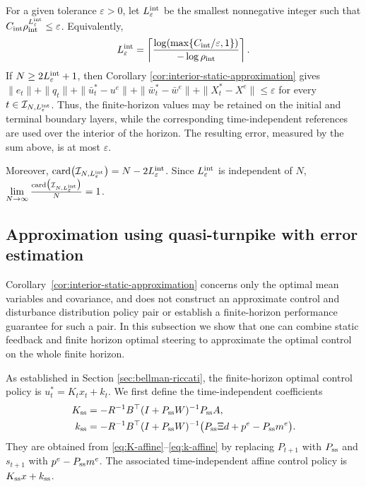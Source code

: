 \documentclass[10pt,journal,twoside]{IEEEtran}
\theoremstyle{definition}
\theoremstyle{remark}
\begin{document}
For a given tolerance \(\varepsilon>0\), let
\(L_{\varepsilon}^{\rm int}\) be the smallest nonnegative integer such that
$C_{\rm int}\rho_{\rm int}^{L_{\varepsilon}^{\rm int}}
\leq \varepsilon$.
Equivalently,
\begin{equation*}
	L_{\varepsilon}^{\rm int}
	=
	\left\lceil
	\frac{
		\log\!\left(
		\max\{C_{\rm int}/\varepsilon,1\}
		\right)
	}{
		-\log\rho_{\rm int}
	}
	\right\rceil .
\end{equation*}
If \(N\geq2L_{\varepsilon}^{\rm int}+1\), then Corollary \ref{cor:interior-static-approximation} gives
$\|e_t\|+\|q_t\|+\|\bar{u}_t^*-u^e\|+\|\bar{w}_t^*-\bar w^e\|+\|X_t^*-X^e\|\leq\varepsilon$
for every
\(t\in\mathcal I_{N,L_{\varepsilon}^{\rm int}}\).
Thus, the finite-horizon values may be retained on the initial and terminal
boundary layers, while the corresponding time-independent references are
used over the interior of the horizon. The resulting error, measured by the
sum above, is at most \(\varepsilon\).

Moreover,
$\operatorname{card}\bigl(\mathcal I_{N,L_{\varepsilon}^{\rm int}}\bigr)=N-2L_{\varepsilon}^{\rm int}$.
Since \(L_{\varepsilon}^{\rm int}\) is independent of \(N\),
$\lim\limits_{N\rightarrow\infty}\frac{\operatorname{card}\bigl(\mathcal I_{N,L_{\varepsilon}^{\rm int}}\bigr)}{N}
    =1$.



\endgroup


\subsection{Approximation using quasi-turnpike with error estimation}\label{subsec:quasi-turnpike}

Corollary~\ref{cor:interior-static-approximation} concerns only the optimal mean variables and covariance, and does not construct an
approximate control and disturbance distribution policy pair or establish a finite-horizon performance guarantee for such a pair. In this subsection we show that one can combine static feedback and finite horizon optimal steering to approximate the optimal control on the whole finite horizon.


As established in Section \ref{sec:bellman-riccati}, the finite-horizon optimal control policy is \(u_t^*=K_tx_t+k_t\). We first
define the time-independent coefficients
\begin{align*}
K_{\rm ss}&=-R^{-1}B^\top(I+P_{\rm ss}W)^{-1}P_{\rm ss}A,\\
k_{\rm ss}
&=-R^{-1}B^\top(I+P_{\rm ss}W)^{-1}
\bigl(P_{\rm ss}\Xi d+p^e-P_{\rm ss}m^e\bigr).
\end{align*}
They are obtained from \eqref{eq:K-affine}--\eqref{eq:k-affine} by replacing
\(P_{t+1}\) with \(P_{\rm ss}\) and \(s_{t+1}\) with
\(p^e-P_{\rm ss}m^e\). The associated time-independent affine control policy is
\(K_{\rm ss}x+k_{\rm ss}\).
\end{document}

